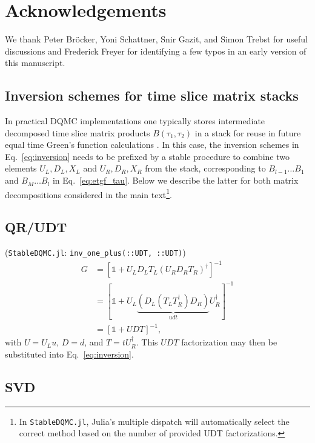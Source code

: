 \documentclass[submission, Phys]{SciPost}
\begin{document}
\section*{Acknowledgements}
We thank Peter Bröcker, Yoni Schattner, Snir Gazit, and Simon Trebst for useful discussions and Frederick Freyer for identifying a few typos in an early version of this manuscript.


\begin{appendix}

\section{Inversion schemes for time slice matrix stacks}

In practical DQMC implementations one typically stores intermediate decomposed time slice matrix products $B(\tau_1, \tau_2)$ in a stack for reuse in future equal time Green's function calculations \cite{Assaad2002a, Santos2003, Broecker2016}. In this case, the inversion schemes in Eq.~\eqref{eq:inversion} needs to be prefixed by a stable procedure to combine two elements $U_L, D_L, X_L$ and $U_R, D_R, X_R$ from the stack, corresponding to $B_{l-1}\dots B_1$ and $B_M \dots B_l$ in Eq.~\ref{eq:etgf_tau}. Below we describe the latter for both matrix decompositions considered in the main text\footnote{In \texttt{StableDQMC.jl}, Julia's multiple dispatch will automatically select the correct method based on the number of provided UDT factorizations.}.

\subsection{QR/UDT}

(\texttt{StableDQMC.jl}: \texttt{inv\_one\_plus(::UDT, ::UDT)})
\begin{align}
	G &= \left[\mathbb{1} + U_L D_L T_L \left( U_R D_R T_R \right)^\dagger \right]^{-1}\nonumber \\
	&= \left[\mathbb{1} + U_L \underbrace{\left( D_L \left( T_L T_R^\dagger \right) D_R \right)}_{udt} U_R^\dagger \right]^{-1} \\
	&= \left[\mathbb{1} + U D T \right]^{-1},\nonumber
\end{align}
with $U=U_Lu$, $D=d$, and $T=tU_R^\dagger$. This $UDT$ factorization may then be substituted into Eq.~\eqref{eq:inversion}.


\subsection{SVD}


\end{appendix}
\end{document}
